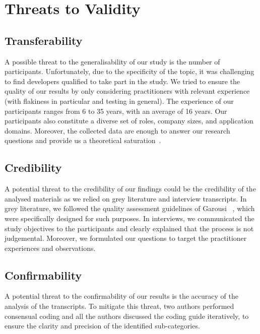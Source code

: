 \section{Threats to Validity}
\label{sec:survey-threats}

\subsection{Transferability} 
A possible threat to the generalisability of our study is the number of participants. Unfortunately, due to the specificity of the topic, it was challenging to find developers qualified to take part in the study. We tried to ensure the quality of our results by only considering practitioners with relevant experience (with flakiness in particular and testing in general). The experience of our participants ranges from 6 to 35 years, with an average of 16 years.
Our participants also constitute a diverse set of roles, company sizes, and application domains.
Moreover, the collected data are enough to answer our research questions and provide us a theoretical saturation~\cite{glaser2007remodeling}.

\subsection{Credibility} 
A potential threat to the credibility of our findings could be the credibility of the analysed materials as we relied on grey literature and interview transcripts.
In grey literature, we followed the quality assessment guidelines of Garousi \etal~\cite{garousi2019guidelines}, which were specifically designed for such purposes.
In interviews, we communicated the study objectives to the participants and clearly explained that the process is not judgemental.
Moreover, we formulated our questions to target the practitioner experiences and observations.

\subsection{Confirmability}
A potential threat to the confirmability of our results is the accuracy of the analysis of the transcripts.
To mitigate this threat, two authors performed consensual coding and all the authors discussed the coding guide iteratively, to ensure the clarity and precision of the identified sub-categories.
